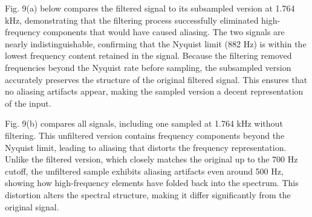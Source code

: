 \documentclass[12pt]{article}
\begin{document}
\FloatBarrier
Fig. 9(a) below compares the filtered signal to its subsampled version at 1.764 kHz, demonstrating that the filtering process successfully eliminated high-frequency components that would have caused aliasing. The two signals are nearly indistinguishable, confirming that the Nyquist limit (882 Hz) is within the lowest frequency content retained in the signal. Because the filtering removed frequencies beyond the Nyquist rate before sampling, the subsampled version accurately preserves the structure of the original filtered signal. This ensures that no aliasing artifacts appear, making the sampled version a decent representation of the input.

Fig. 9(b) compares all signals, including one sampled at 1.764 kHz without filtering. This unfiltered version contains frequency components beyond the Nyquist limit, leading to aliasing that distorts the frequency representation. Unlike the filtered version, which closely matches the original up to the 700 Hz cutoff, the unfiltered sample exhibits aliasing artifacts even around 500 Hz, showing how high-frequency elements have folded back into the spectrum. This distortion alters the spectral structure, making it differ significantly from the original signal. 
\FloatBarrier
\end{document}
